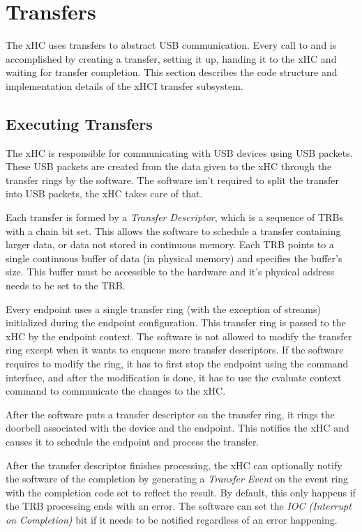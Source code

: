 \section{Transfers}
\label{sec:transfers}

The xHC uses transfers to abstract USB communication. Every call to
 and  is accomplished by creating a transfer,
setting it up, handing it to the xHC and waiting for transfer completion. This
section describes the code structure and implementation details of the xHCI transfer
subsystem.

\subsection{Executing Transfers}

The xHC is responsible for communicating with USB devices using USB packets.
These USB packets are created from the data given to the xHC through the
transfer rings by the software. The software isn't required to split the
transfer into USB packets, the xHC takes care of that.

Each transfer is formed by a \textit{Transfer Descriptor}, which is a sequence
of TRBs with a chain bit set. This allows the software to schedule a transfer
containing larger data, or data not stored in continuous memory. Each TRB
points to a single continuous buffer of data (in physical memory) and specifies
the buffer's size. This buffer must be accessible to the hardware and it's
physical address needs to be set to the TRB.

Every endpoint uses a single transfer ring (with the exception of streams)
initialized during the endpoint configuration. This transfer ring is passed to
the xHC by the endpoint context. The software is not allowed to modify the
transfer ring except when it wants to enqueue more transfer descriptors. If the
software requires to modify the ring, it has to first stop the endpoint using
the command interface, and after the modification is done, it has to use the
evaluate context command to communicate the changes to the xHC.

After the software puts a transfer descriptor on the transfer ring, it rings
the doorbell associated with the device and the endpoint. This notifies the xHC
and causes it to schedule the endpoint and process the transfer.

After the transfer descriptor finishes processing, the xHC can optionally
notify the software of the completion by generating a \textit{Transfer Event}
on the event ring with the completion code set to reflect the result. By
default, this only happens if the TRB processing ends with an error.
The software can set the \textit{IOC (Interrupt on Completion)} bit if it needs
to be notified regardless of an error happening.

